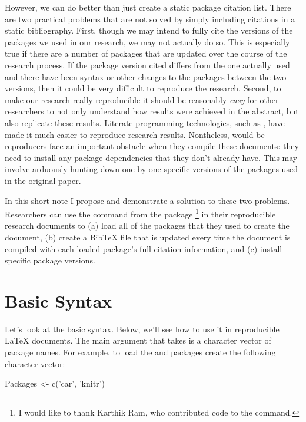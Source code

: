 However, we can do better than just create a static package citation list. There are two practical problems that are not solved by simply including citations in a static bibliography. First, though we may intend to fully cite the versions of the packages we used in our research, we may not actually do so. This is especially true if there are a number of packages that are updated over the course of the research process. If the package version cited differs from the one actually used and there have been syntax or other changes to the packages between the two versions, then it could be very difficult to reproduce the research. Second, to make our research really reproducible it should be reasonably \emph{easy} for other researchers to not only understand how results were achieved in the abstract, but also replicate these results. Literate programming technologies, such as  \citep{R-knitr}, have made it much easier to reproduce research results. Nontheless, would-be reproducers face an important obstacle when they compile these documents: they need to install any package dependencies that they don't already have. This may involve arduously hunting down one-by-one specific versions of the packages used in the original paper. 

In this short note I propose and demonstrate a solution to these two problems. Researchers can use the  command from the  package \citep{R-repmis}\footnote{I would like to thank Karthik Ram, who contributed code to the command.} in their reproducible research documents to (a) load all of the packages that they used to create the document, (b) create a BibTeX file that is updated every time the document is compiled with each loaded package’s full citation information, and (c) install specific package versions. 

\section{Basic Syntax}

Let's look at the basic  syntax. Below, we'll see how to use it in reproducible LaTeX documents. The main argument that  takes is a character vector of package names. For example, to load the  \citep{R-car} and  packages create the following character vector:

\begin{example}
  Packages <- c('car', 'knitr')
\end{example}

